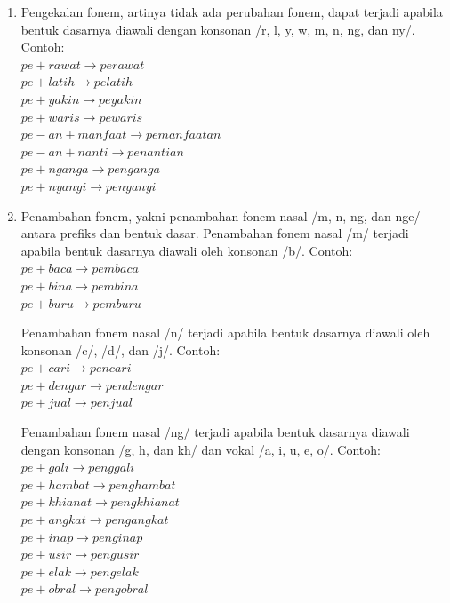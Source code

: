 \begin{enumerate}
	\item Pengekalan fonem, artinya tidak ada perubahan fonem, dapat terjadi apabila bentuk dasarnya diawali dengan konsonan /r, l, y, w, m, n, ng, dan ny/. Contoh:\\
	$pe + rawat \rightarrow perawat$\\	
	$pe + latih \rightarrow pelatih$\\
	$pe + yakin \rightarrow peyakin$\\
	$pe + waris \rightarrow pewaris$\\
	$pe-an + manfaat \rightarrow pemanfaatan$\\
	$pe-an + nanti \rightarrow penantian$\\
	$pe + nganga \rightarrow penganga$\\
	$pe + nyanyi \rightarrow penyanyi$
	
	\item Penambahan fonem, yakni penambahan fonem nasal /m, n, ng, dan nge/ antara prefiks dan bentuk dasar. Penambahan fonem nasal /m/ terjadi apabila bentuk dasarnya diawali oleh konsonan /b/. Contoh:\\
	$pe + baca \rightarrow pembaca$\\
	$pe + bina \rightarrow pembina$\\
	$pe + buru \rightarrow pemburu$
	
	Penambahan fonem nasal /n/ terjadi apabila bentuk dasarnya diawali oleh konsonan /c/, /d/, dan /j/. Contoh:\\
	$pe + cari \rightarrow pencari$\\
	$pe + dengar \rightarrow pendengar$\\
	$pe + jual \rightarrow penjual$
	
	Penambahan fonem nasal /ng/ terjadi apabila bentuk dasarnya diawali dengan konsonan /g, h, dan kh/ dan vokal /a, i, u, e, o/. Contoh:\\
	$pe + gali \rightarrow penggali$\\
	$pe + hambat \rightarrow penghambat$\\
	$pe + khianat \rightarrow pengkhianat$\\
	$pe + angkat \rightarrow pengangkat$\\
	$pe + inap \rightarrow penginap$\\
	$pe + usir \rightarrow pengusir$\\
	$pe + elak \rightarrow pengelak$\\
	$pe + obral \rightarrow pengobral$
	

\end{enumerate}
